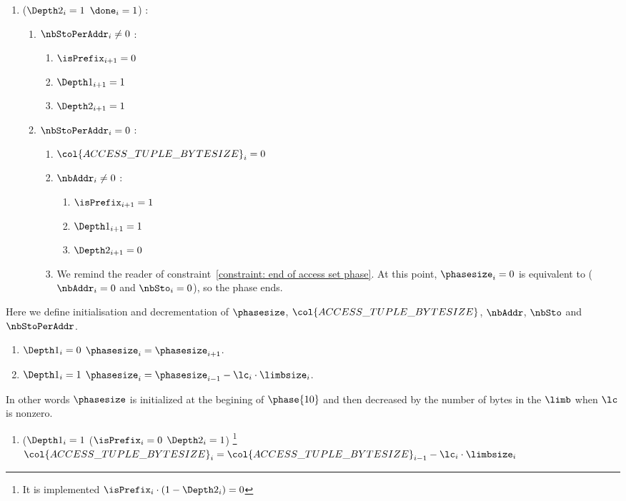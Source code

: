 \begin{enumerate}[resume]
	\item \If ($\Depth2_{i}=1$ \et $\done_{i}=1$) \Then:
	\begin{enumerate}
		\item \If $\nbStoPerAddr_{i} \neq 0$ \Then:
		\begin{enumerate}
		 	\item $\isPrefix_{i+1}=0$  
		 	\item $\Depth1_{i+1}=1$ 
		 	\item $\Depth2_{i+1}=1$
		\end{enumerate}
		\item \If $\nbStoPerAddr_{i}=0$ \Then:
		\begin{enumerate}
			\item $\col{ACCESS\_TUPLE\_BYTESIZE}_{i}=0$
		 	\item \If $\nbAddr_{i} \neq 0$ \Then:
		 		\begin{enumerate}
			 		\item $\isPrefix_{i+1}=1$
			 		\item $\Depth1_{i+1}=1$
			 		\item $\Depth2_{i+1}=0$
		 		\end{enumerate}
			\item \trash We remind the reader of constraint~\ref{constraint: end of access set phase}. At this point, $\phasesize_{i}=0$ is equivalent to ($\nbAddr_{i} = 0$ and $\nbSto_{i}=0$), so the phase ends.
		\end{enumerate} 
	\end{enumerate}
\end{enumerate}
Here we define initialisation and decrementation of $\phasesize$, $\col{ACCESS\_TUPLE\_BYTESIZE}$, $\nbAddr$, $\nbSto$ and $\nbStoPerAddr$.
\begin{enumerate}[resume]
    \item \If $\Depth1_{i}=0$ \Then $\phasesize_{i} = \phasesize_{i+1}$.
    \item \If $\Depth1_{i}=1$ \Then $\phasesize_{i} = \phasesize_{i-1} - \lc_{i} \cdot \limbsize_{i}$. 
\end{enumerate}
In other words $\phasesize$ is initialized at the begining of $\phase{10}$ and then decreased by the number of bytes in the $\limb$ when $\lc$ is nonzero.
\begin{enumerate}[resume]

    \item \If ($\Depth1_{i}=1$ \et ($\isPrefix_{i}=0$ \Or $\Depth2_{i}=1$) \footnote{It is implemented \If $\isPrefix_{i} \cdot (1 - \Depth2_{i})=0$ \Then} \Then $\col{ACCESS\_TUPLE\_BYTESIZE}_{i}=\col{ACCESS\_TUPLE\_BYTESIZE}_{i-1} - \lc_{i} \cdot \limbsize_{i}$

\end{enumerate}
